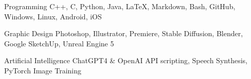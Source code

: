 


\begin{cvskills}


  \cvskill
    {Programming} %
    {C++, C, Python, Java, LaTeX, Markdown, Bash, GitHub, Windows, Linux, Android, iOS} %

  \cvskill
    {Graphic Design} %
    {Photoshop, Illustrator, Premiere, Stable Diffusion, Blender, Google SketchUp, Unreal Engine 5} %

  \cvskill
    {Artificial Intelligence} %
	{ChatGPT4 \& OpenAI API scripting, Speech Synthesis, PyTorch Image Training} %


\end{cvskills}
